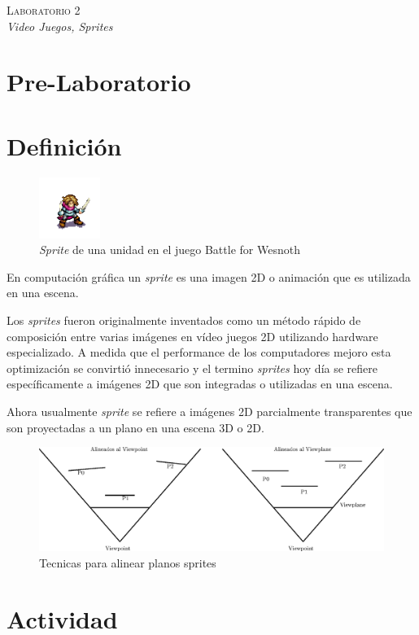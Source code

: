 \begin{center}
\textsc{\Large Laboratorio 2}~\\
\emph{\large Video Juegos, Sprites}
\end{center}

\section{Pre-Laboratorio}

\section{Definición}
\begin{figure}
\includegraphics[width=75px]{semana2/sprite_ej1.png} 
\caption{\emph{Sprite} de una unidad en el juego Battle for Wesnoth \cite{wesnothgame}}
\end{figure}

En computación gráfica un \emph{sprite} es una imagen 2D o animación que es utilizada en una escena.

Los \emph{sprites} fueron originalmente inventados como un método rápido de composición entre varias imágenes en vídeo juegos 2D utilizando hardware especializado. A medida que el performance de los computadores mejoro esta optimización se convirtió innecesario y el termino \emph{sprites} hoy día se refiere específicamente a imágenes 2D que son integradas o utilizadas en una escena.

Ahora usualmente \emph{sprite} se refiere a imágenes 2D parcialmente transparentes que son proyectadas a un plano en una escena 3D o 2D.
\begin{figure}[H]
\centering
\includegraphics[width=0.9\linewidth]{semana2/bills.eps} 
\caption{Tecnicas para alinear planos sprites}
\end{figure}

\section{Actividad}
